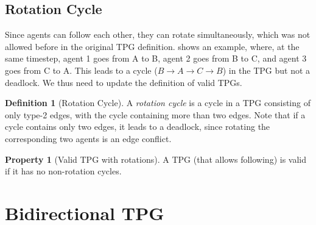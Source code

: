 \documentclass[letterpaper]{article} %
\theoremstyle{definition}
\newtheorem{definition}{Definition}
\newtheorem{property}{Property}
\newcommand{\andrew}[1]{\textcolor{black}{\textbf{Yifan:}} \textcolor{blue}{#1}}
\begin{document}
 \subsection{Rotation Cycle}
Since agents can follow each other, they can rotate simultaneously, which was not allowed before in the original TPG definition.  shows an example, where, at the same timestep, agent 1 goes from A to B, agent 2 goes from B to C, and agent 3 goes from C to A.
This leads to a cycle ($B\rightarrow A \rightarrow C \rightarrow B$) in the TPG but not a deadlock. We thus need to update the definition of valid TPGs.
 \begin{definition}[Rotation Cycle]
\label{def: rotation cycle}
   A \emph{rotation cycle} is a cycle in a TPG consisting of only type-2 edges, with the cycle containing more than two edges. Note that if a cycle contains only two edges, it leads to a deadlock, since rotating the corresponding two agents is an edge conflict. %
\end{definition}
\begin{property}[Valid TPG with rotations]
\label{prop: valid TPG }
A TPG (that allows following) is valid if it has no non-rotation cycles.
\end{property}

\section{Bidirectional TPG}\label{sec:BTPG}
%              
\end{document}
